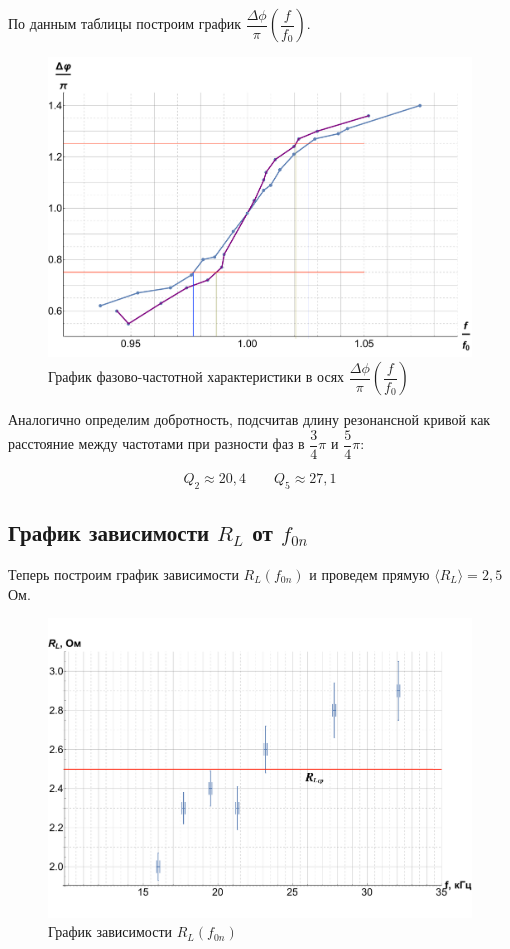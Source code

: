\documentclass[12pt]{kiarticle}
\begin{document}
По данным таблицы построим график $ \dfrac{\Delta\phi}{\pi}  \left( \dfrac{f}{f_0} \right) $.

\begin{figure}[h!]
	\includegraphics[scale=0.5]{Fii.pdf}
	\caption{График фазово-частотной характеристики в осях $ \dfrac{\Delta\phi}{\pi}  \left( \dfrac{f}{f_0} \right) $}
\end{figure}

Аналогично определим добротность, подсчитав длину резонансной кривой как  расстояние между частотами при разности фаз в $ \dfrac{3}{4}\pi $ и $ \dfrac{5}{4}\pi $:

\begin{equation}\label{}
Q_2 \approx 20,4 \qquad Q_5 \approx 27,1 
\end{equation}

\subsection{График  зависимости $ R_L $ от $ f_{0n} $} 

Теперь построим график зависимости $ R_L (f_{0n}) $ и проведем прямую $ \langle R_L \rangle = 2,5 $ Ом. 

\begin{figure}[h!]
	\includegraphics[scale=0.5]{RR.pdf}
	\caption{График зависимости $ R_L (f_{0n}) $}
\end{figure}
 
\end{document}
